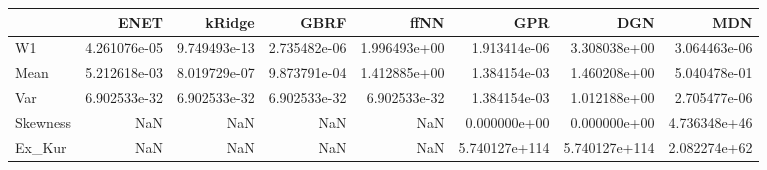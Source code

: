 \begin{tabular}{lrrrrrrr}
\toprule
{} &          ENET &        kRidge &          GBRF &          ffNN &            GPR &            DGN &           MDN \\
\midrule
W1       &  4.261076e-05 &  9.749493e-13 &  2.735482e-06 &  1.996493e+00 &   1.913414e-06 &   3.308038e+00 &  3.064463e-06 \\
Mean     &  5.212618e-03 &  8.019729e-07 &  9.873791e-04 &  1.412885e+00 &   1.384154e-03 &   1.460208e+00 &  5.040478e-01 \\
Var      &  6.902533e-32 &  6.902533e-32 &  6.902533e-32 &  6.902533e-32 &   1.384154e-03 &   1.012188e+00 &  2.705477e-06 \\
Skewness &           NaN &           NaN &           NaN &           NaN &   0.000000e+00 &   0.000000e+00 &  4.736348e+46 \\
Ex\_Kur   &           NaN &           NaN &           NaN &           NaN &  5.740127e+114 &  5.740127e+114 &  2.082274e+62 \\
\bottomrule
\end{tabular}
